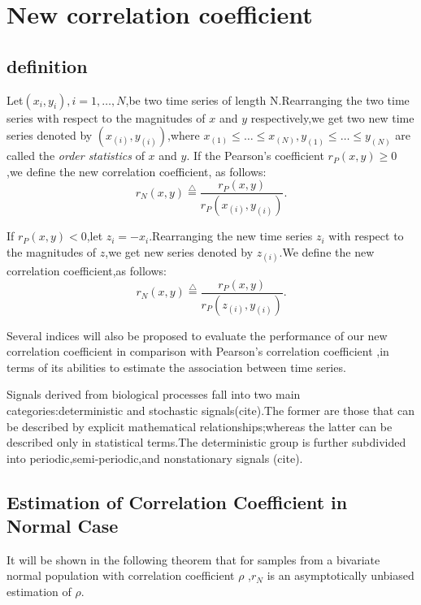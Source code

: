 \documentclass[journal]{IEEEtran}
\begin{document}
\section{New correlation coefficient}
\subsection{definition}
    Let$(x_{i},y_{i}),i=1,\dots ,N$,be two time series of length N.Rearranging the two time series with respect to the magnitudes of $x$ and $y$ respectively,we get two new time series denoted by $(x_{(i)},y_{(i)})$,where $x_{(1)}\leq \dots \leq x_{(N)},y_{(1)}\leq \dots \leq y_{(N)}$ are called the \emph{order statistics } of $x$ and $y$. If the Pearson's coefficient $r_{P}(x,y)\geq 0$ ,we define the new correlation coefficient, as follows: \begin{equation} \label{equ:def1}
    r_{N}(x,y)\overset{\bigtriangleup }{=}\frac{r_{P}(x,y)}{r_{P}(x_{(i)},y_{(i)})}.
    \end{equation}

    If $r_{P}(x,y)<0$,let $z_{i}=-x_{i}$.Rearranging the new time series $z_{i}$ with respect to the magnitudes of $z$,we get new series denoted by $z_{(i)}$.We define the new correlation coefficient,as follows:
    \begin{equation} \label{equ:def2}
    r_{N}(x,y)\overset{\bigtriangleup }{=}\frac{r_{P}(x,y)}{r_{P}(z_{(i)},y_{(i)})}.
    \end{equation}

    Several indices will also be proposed to evaluate the performance of our new correlation coefficient in comparison with Pearson's correlation coefficient ,in terms of its abilities to estimate the association between time series.

    Signals derived from biological processes fall into two main categories:deterministic and stochastic signals(cite).The former are those that can be described by explicit mathematical relationships;whereas the latter can be described  only in statistical terms.The deterministic group is further subdivided into periodic,semi-periodic,and nonstationary signals (cite).

\subsection{Estimation of Correlation Coefficient in Normal Case}
    It will be shown in the following theorem that for samples from a bivariate normal population with correlation coefficient $\rho $ ,$r_{N}$ is an asymptotically unbiased estimation of $\rho $.
\end{document}
